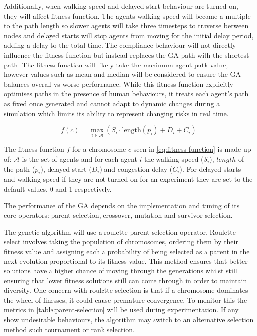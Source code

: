 \documentclass[12pt,a4paper]{report}
\begin{document}
Additionally, when walking speed and delayed start behaviour are turned on, they will affect fitness function. The agents walking speed will become a multiple to the path length so slower agents will take three timesteps to traverse between nodes and delayed starts will stop agents from moving for the initial delay period, adding a delay to the total time. The compliance behaviour will not directly influence the fitness function but instead replaces the GA path with the shortest path. The fitness function will likely take the maximum agent path value, however values such as mean and median will be considered to ensure the GA balances overall vs worse performance. While this fitness function explicitly optimises paths in the presence of human behaviours, it treats each agent’s path as fixed once generated and cannot adapt to dynamic changes during a simulation which limits its ability to represent changing risks in real time.

\begin{equation}
    f(c) = \max_{i \in \mathcal{A}} (S_i \cdot \mathrm{length}(p_i) + D_i + C_i)
    \label{eq:fitness-function}
\end{equation}

\noindent The fitness function $f$ for a chromosome $c$ seen in \autoref{eq:fitness-function} is made up of: $\mathcal{A}$ is the set of agents and for each agent $i$ the walking speed ($S_i$), $length$ of the path ($p_i$), delayed start ($D_i$) and congestion delay ($C_i$). For delayed starts and walking speed if they are not turned on for an experiment they are set to the default values, 0 and 1 respectively.

The performance of the GA depends on the implementation and tuning of its core operators: parent selection, crossover, mutation and survivor selection.

The genetic algorithm will use a roulette parent selection operator. Roulette select involves taking the population of chromosomes, ordering them by their fitness value and assigning each a probability of being selected as a parent in the next evolution proportional to its fitness value. This method ensures that better solutions have a higher chance of moving through the generations whilst still ensuring that lower fitness solutions still can come through in order to maintain diversity. One concern with roulette selection is that if a chromosome dominates the wheel of finesses, it could cause premature convergence. To monitor this the metrics in \autoref{table:parent-selection} will be used during experimentation. If any show undesirable behaviours, the algorithm may switch to an alternative selection method such tournament or rank selection.
\end{document}
